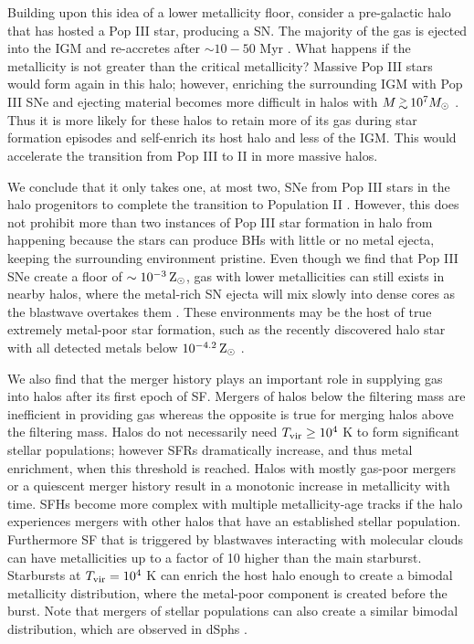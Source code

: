 \documentclass[12pt,preprint]{aastex}
\begin{document}
Building upon this idea of a lower metallicity floor, consider a
pre-galactic halo that has hosted a Pop III star, producing a SN.  The
majority of the gas is ejected into the IGM and re-accretes after
$\sim 10-50$ Myr \citep{Johnson07, Wise08_Gal}.  What happens if the
metallicity is not greater than the critical metallicity?  Massive Pop
III stars would form again in this halo; however, enriching the
surrounding IGM with Pop III SNe and ejecting material becomes more
difficult in halos with $M \gsim 10^7 \Ms$ \citep{Whalen08_SN}.  Thus
it is more likely for these halos to retain more of its gas during
star formation episodes and self-enrich its host halo and less of the
IGM.  This would accelerate the transition from Pop III to II in more
massive halos.

We conclude that it only takes one, at most two, SNe from Pop III
stars in the halo progenitors to complete the transition to Population
II \citep{Frebel10}.  However, this does not prohibit more than two
instances of Pop III star formation in halo from happening because the
stars can produce BHs with little or no metal ejecta, keeping the
surrounding environment pristine.  Even though we find that Pop III
SNe create a floor of $\sim 10^{-3} {\rm\,Z_\odot}$, gas with lower
metallicities can still exists in nearby halos, where the metal-rich
SN ejecta will mix slowly into dense cores as the blastwave overtakes
them \citep{Cen08}.  These environments may be the host of true
extremely metal-poor star formation, such as the recently discovered
halo star with all detected metals below $10^{-4.2} {\rm\,Z_\odot}$
\citep{Caffau11}.

We also find that the merger history plays an important role in
supplying gas into halos after its first epoch of SF.  Mergers of
halos below the filtering mass are inefficient in providing gas
whereas the opposite is true for merging halos above the filtering
mass.  Halos do not necessarily need $\tvir \ge 10^4$ K to form
significant stellar populations; however SFRs dramatically increase,
and thus metal enrichment, when this threshold is reached.  Halos with
mostly gas-poor mergers or a quiescent merger history result in a
monotonic increase in metallicity with time.  SFHs become more complex
with multiple metallicity-age tracks if the halo experiences mergers
with other halos that have an established stellar population.
Furthermore SF that is triggered by blastwaves interacting with
molecular clouds can have metallicities up to a factor of 10 higher
than the main starburst.  Starbursts at $\tvir = 10^4$ K can enrich
the host halo enough to create a bimodal metallicity distribution,
where the metal-poor component is created before the burst.  Note that
mergers of stellar populations can also create a similar bimodal
distribution, which are observed in dSphs \citep{Battaglia11}.
\end{document}
